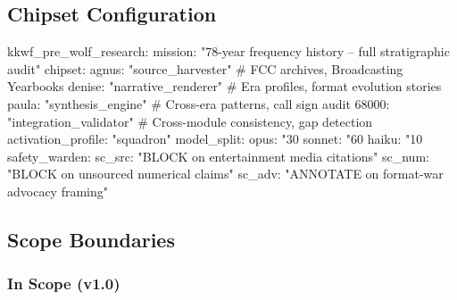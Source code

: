 \documentclass[11pt,letterpaper]{article}
\begin{document}
\subsection{Chipset Configuration}

\begin{asciibox}
kkwf_pre_wolf_research:
  mission: "78-year frequency history -- full stratigraphic audit"
  chipset:
    agnus: "source_harvester"        # FCC archives, Broadcasting Yearbooks
    denise: "narrative_renderer"     # Era profiles, format evolution stories
    paula: "synthesis_engine"        # Cross-era patterns, call sign audit
    68000: "integration_validator"   # Cross-module consistency, gap detection
  activation_profile: "squadron"
  model_split:
    opus: "30%
    sonnet: "60%
    haiku: "10%
  safety_warden:
    sc_src: "BLOCK on entertainment media citations"
    sc_num: "BLOCK on unsourced numerical claims"
    sc_adv: "ANNOTATE on format-war advocacy framing"
\end{asciibox}

\subsection{Scope Boundaries}

\subsubsection{In Scope (v1.0)}
\end{document}
